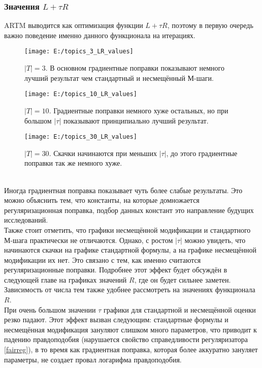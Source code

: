 \documentclass[12pt]{article}
\begin{document}
\subsubsection{Значения $L + \tau R$}
ARTM выводится как оптимизация функции $L + \tau R$, поэтому в первую очередь важно поведение именно данного функционала на итерациях.\\
\begin{figure}[H]
	\centering
	\caption{$|T| = 3$. В основном градиентные поправки показывают немного лучший результат чем стандартный и несмещённый М-шаги. }   
	\medskip   
	\texttt{[image: E:/topics\_3\_LR\_values]}
\end{figure}
\begin{figure}[H]
	\centering
	\caption{$|T| = 10$. Градиентные поправки немного хуже остальных, но при большом $|\tau|$ показывают принципиально лучший результат.}      
	\medskip
	\texttt{[image: E:/topics\_10\_LR\_values]}
\end{figure}
\begin{figure}[H]
	\centering
	\caption{$|T| = 30$. Скачки начинаются при меньших $|\tau|$, до этого градиентные поправки так же немного хуже.}      
	\medskip
	\texttt{[image: E:/topics\_30\_LR\_values]}
\end{figure}
\ \\
Иногда градиентная поправка показывает чуть более слабые результаты. Это можно объяснить тем, что константы, на которые домножается регуляризационная поправка,  подбор данных констант это направление будущих исследований. \\
Также стоит отметить, что  графики несмещённой модификации и стандартного М-шага практически не отличаются. Однако, с ростом $|\tau|$ можно увидеть, что начинаются скачки на графике стандартной формулы, а на графике несмещённой модификации их нет. Это связано с тем, как именно считаются регуляризационные поправки. Подробнее этот эффект будет обсуждён в следующей главе на графиках значений $R$, где он будет сильнее заметен.\\
Зависимость от числа тем также удобнее рассмотреть на значениях функционала $R$.\\
При очень большом значении $\tau$ графики для стандартной и несмещённой оценки резко падают. Этот эффект вызван следующим: стандартные формулы и несмещённая модификация зануляют слишком много параметров, что приводит к падению правдоподобия (нарушается свойство справедливости регуляризатора \ref{fairreg}), в то время как градиентная поправка, которая более аккуратно зануляет параметры, не создает провал логарифма правдоподобия.
\end{document}
